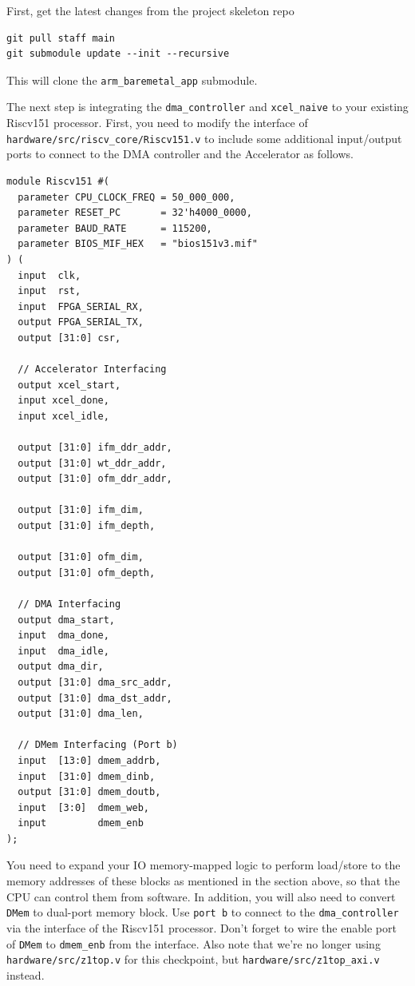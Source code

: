 \documentclass[11pt]{article}
\begin{document}
First, get the latest changes from the project skeleton repo

\begin{verbatim}
git pull staff main
git submodule update --init --recursive
\end{verbatim}

This will clone the \verb|arm_baremetal_app| submodule.

The next step is integrating the \texttt{dma\_controller} and \texttt{xcel\_naive} to your existing Riscv151 processor.
First, you need to modify the interface of \verb|hardware/src/riscv_core/Riscv151.v| to include some additional input/output ports to connect to the DMA controller and the Accelerator as follows.

\begin{verbatim}
module Riscv151 #(
  parameter CPU_CLOCK_FREQ = 50_000_000,
  parameter RESET_PC       = 32'h4000_0000,
  parameter BAUD_RATE      = 115200,
  parameter BIOS_MIF_HEX   = "bios151v3.mif"
) (
  input  clk,
  input  rst,
  input  FPGA_SERIAL_RX,
  output FPGA_SERIAL_TX,
  output [31:0] csr,

  // Accelerator Interfacing
  output xcel_start,
  input xcel_done,
  input xcel_idle,

  output [31:0] ifm_ddr_addr,
  output [31:0] wt_ddr_addr,
  output [31:0] ofm_ddr_addr,

  output [31:0] ifm_dim,
  output [31:0] ifm_depth,

  output [31:0] ofm_dim,
  output [31:0] ofm_depth,

  // DMA Interfacing
  output dma_start,
  input  dma_done,
  input  dma_idle,
  output dma_dir,
  output [31:0] dma_src_addr,
  output [31:0] dma_dst_addr,
  output [31:0] dma_len,

  // DMem Interfacing (Port b)
  input  [13:0] dmem_addrb,
  input  [31:0] dmem_dinb,
  output [31:0] dmem_doutb,
  input  [3:0]  dmem_web,
  input         dmem_enb
);
\end{verbatim}

You need to expand your IO memory-mapped logic to perform load/store to the memory addresses of these blocks as mentioned in the section above,
so that the CPU can control them from software. In addition, you will also need to convert \texttt{DMem} to dual-port memory block.
Use \texttt{port b} to connect to the \texttt{dma\_controller} via the interface of the Riscv151 processor.
Don't forget to wire the enable port of \texttt{DMem} to \texttt{dmem\_enb} from the interface.
Also note that we're no longer using \verb|hardware/src/z1top.v| for this checkpoint, but \verb|hardware/src/z1top_axi.v| instead.
\end{document}
